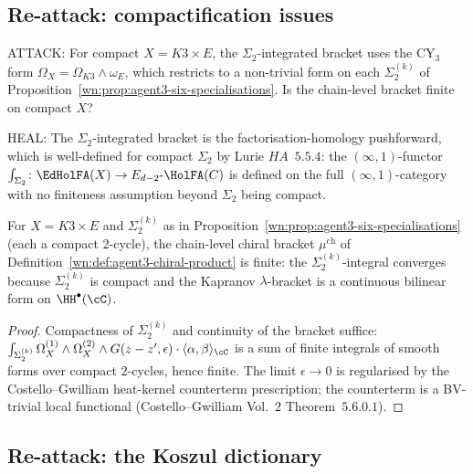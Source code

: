 \subsection{Re-attack: compactification issues}
\label{wn:subsec:agent3-compactification}

ATTACK: For compact $X=K3\times E$, the $\Sigma_2$-integrated bracket uses the CY$_3$ form $\Omega_X=\Omega_{K3}\wedge\omega_E$, which restricts to a non-trivial form on each $\Sigma_2^{(k)}$ of Proposition~\ref{wn:prop:agent3-six-specialisations}. Is the chain-level bracket finite on compact $X$?

HEAL: The $\Sigma_2$-integrated bracket is the factorisation-homology pushforward, which is well-defined for compact $\Sigma_2$ by Lurie $HA$~$5.5.4$: the $(\infty,1)$-functor $\int_{\Sigma_2}\colon\EdHolFA(X)\to E_{d-2}\text{-}\HolFA(C)$ is defined on the full $(\infty,1)$-category with no finiteness assumption beyond $\Sigma_2$ being compact.

\begin{proposition}
\label{wn:prop:agent3-compact-sigma2-finite}
\ClaimStatusProvedHere
For $X=K3\times E$ and $\Sigma_2^{(k)}$ as in Proposition~\ref{wn:prop:agent3-six-specialisations} (each a compact $2$-cycle), the chain-level chiral bracket $\mu^{\mathrm{ch}}$ of Definition~\ref{wn:def:agent3-chiral-product} is finite: the $\Sigma_2^{(k)}$-integral converges because $\Sigma_2^{(k)}$ is compact and the Kapranov $\lambda$-bracket is a continuous bilinear form on $\HH^\bullet(\cC)$.
\end{proposition}

\begin{proof}
Compactness of $\Sigma_2^{(k)}$ and continuity of the bracket suffice: $\int_{\Sigma_2^{(k)}}\Omega_X^{(1)}\wedge\Omega_X^{(2)}\wedge G(z-z',\epsilon)\cdot\langle\alpha,\beta\rangle_\cC$ is a sum of finite integrals of smooth forms over compact $2$-cycles, hence finite. The limit $\epsilon\to 0$ is regularised by the Costello--Gwilliam heat-kernel counterterm prescription; the counterterm is a BV-trivial local functional (Costello--Gwilliam Vol.~$2$ Theorem~$5.6.0.1$).
\end{proof}

\subsection{Re-attack: the Koszul dictionary}
\label{wn:subsec:agent3-koszul-reattack}

